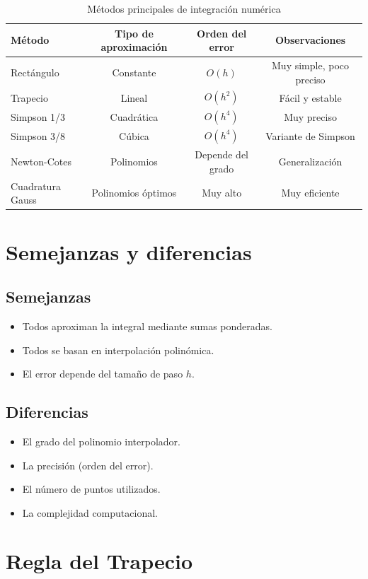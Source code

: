 \documentclass[12pt,a4paper]{article}
\begin{document}
\begin{table}[h!]
\centering
\begin{tabular}{lccc}
\toprule
Método & Tipo de aproximación & Orden del error & Observaciones \\
\midrule
Rectángulo & Constante & $O(h)$ & Muy simple, poco preciso \\
Trapecio & Lineal & $O(h^2)$ & Fácil y estable \\
Simpson 1/3 & Cuadrática & $O(h^4)$ & Muy preciso \\
Simpson 3/8 & Cúbica & $O(h^4)$ & Variante de Simpson \\
Newton-Cotes & Polinomios & Depende del grado & Generalización \\
Cuadratura Gauss & Polinomios óptimos & Muy alto & Muy eficiente \\
\bottomrule
\end{tabular}
\caption{Métodos principales de integración numérica}
\end{table}

\section{Semejanzas y diferencias}

\subsection{Semejanzas}
\begin{itemize}
\item Todos aproximan la integral mediante sumas ponderadas.
\item Todos se basan en interpolación polinómica.
\item El error depende del tamaño de paso $h$.
\end{itemize}

\subsection{Diferencias}
\begin{itemize}
\item El grado del polinomio interpolador.
\item La precisión (orden del error).
\item El número de puntos utilizados.
\item La complejidad computacional.
\end{itemize}

\section{Regla del Trapecio}
\end{document}
